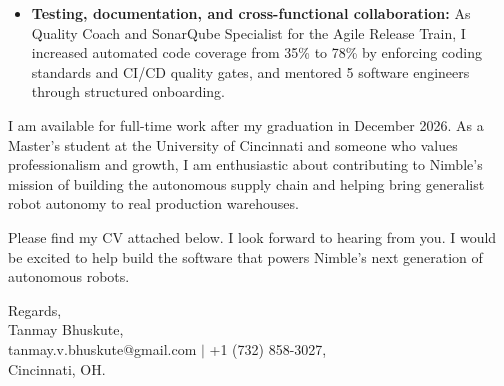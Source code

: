 \documentclass[11pt]{letter}
\begin{document}
\begin{letter}{}
\begin{itemize}[leftmargin=*, itemsep=0.45em]
    \item \textbf{Testing, documentation, and cross-functional collaboration:} As Quality Coach and SonarQube Specialist for the Agile Release Train, I increased automated code coverage from 35\% to 78\% by enforcing coding standards and CI/CD quality gates, and mentored 5 software engineers through structured onboarding.
\end{itemize}

I am available for full-time work after my graduation in December 2026. As a Master's student at the University of Cincinnati and someone who values professionalism and growth, I am enthusiastic about contributing to Nimble's mission of building the autonomous supply chain and helping bring generalist robot autonomy to real production warehouses.

Please find my CV attached below. I look forward to hearing from you. I would be excited to help build the software that powers Nimble's next generation of autonomous robots.

{\setlength{\parskip}{0pt}
Regards,\\
Tanmay Bhuskute,\\
tanmay.v.bhuskute@gmail.com $\mid$ +1 (732) 858-3027,\\
Cincinnati, OH.
}

\end{letter}
\end{document}
